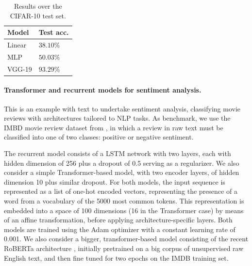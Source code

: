 \begin{table}[ht]
\caption{Results over the CIFAR-10 test set.}
\centering
\begin{tabular}{ll}
Model & Test acc. \\
\hline
Linear &  $38.10\%$ \\
MLP &  $50.03\%$\\
VGG-19 &  $93.29\%$ 
\end{tabular}
\label{tab:cnn}
\end{table}

\paragraph{Transformer and recurrent models for sentiment analysis.}
This is an example with text to undertake sentiment analysis, classifying movie reviews with architectures tailored to NLP tasks. As benchmark, we use the IMBD movie review dataset 
from \parencite{maas-EtAl:2011:ACL-HLT2011}, in which a review in raw text must be classified into one of two classes: positive or negative
sentiment. 

The recurrent model consists of a LSTM network with two layers, each with hidden dimension of 256 plus a dropout of 0.5 serving as a regularizer. We also consider a simple Transformer-based model, with two encoder layers, of hidden dimension 10 plus similar dropout. For both models, the input sequence is represented as a list of one-hot encoded vectors, representing the presence of a word from a vocabulary of the 5000 most common tokens. This representation is embedded into a space of 100 dimensions
(16 in the Transformer case) by means of an affine transformation, before applying architecture-specific layers. Both models are trained using the Adam optimizer with a constant learning rate of 0.001.
We also consider a bigger, transformer-based model consisting of the recent RoBERTa architecture \parencite{liu2019roberta}, 
initially pretrained on a big corpus of unsupervised raw  English text, and then fine tuned for two epochs on the IMDB training set. %

